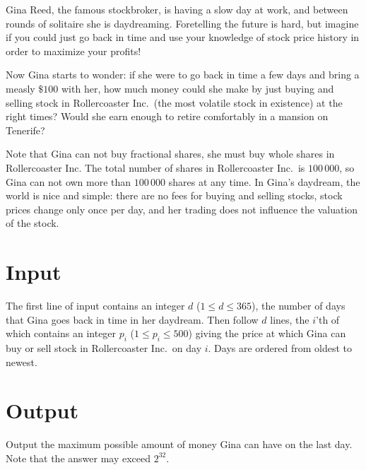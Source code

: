 
%
\noindent
Gina Reed, the famous stockbroker, is having a slow day at work, and
between rounds of solitaire she is daydreaming.  Foretelling the
future is hard, but imagine if you could just go back in time and use
your knowledge of stock price history in order to maximize your
profits!

Now Gina starts to wonder: if she were to go back in time a few days
and bring a measly $\$100$ with her, how much money could she make by just buying and
selling stock in Rollercoaster Inc.~(the most volatile stock in
existence) at the right times? Would she earn enough to retire comfortably in a
mansion on Tenerife?

Note that Gina can not buy fractional shares, she must buy whole
shares in Rollercoaster Inc. The total number of shares in
Rollercoaster Inc.~is $100\,000$, so Gina can not own more than
$100\,000$ shares at any time.  In Gina's daydream, the world is nice
and simple: there are no fees for buying and selling stocks,
stock prices change only once per day,
and her trading does not influence the valuation of the stock.

\section*{Input}

The first line of input contains an integer $d$ ($1 \le d \le 365$),
the number of days that Gina goes back in time in her daydream.  Then
follow $d$ lines, the $i$'th of which contains an integer $p_i$
($1 \le p_i \le 500$) giving the price at which Gina can buy or sell
stock in Rollercoaster Inc.~on day $i$. Days are ordered from oldest
to newest.

\section*{Output}

Output the maximum possible amount of money Gina can have on the last
day. Note that the answer may exceed $2^{32}$.
